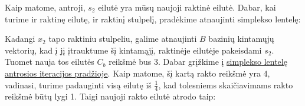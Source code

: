 \documentclass{article}
\begin{document}
Kaip matome, antroji, $s_2$ eilutė yra mūsų naujoji raktinė eilutė. Dabar, kai turime ir raktinę eilutę, ir raktinį stulpelį, pradėkime atnaujinti simplekso lentelę:
\begin{table}[H]
    \centering
\end{table}
Kadangi $x_2$ tapo raktiniu stulpeliu, galime atnaujinti $B$ bazinių kintamųjų vektorių, kad į jį įtrauktume šį kintamąjį, raktinėje eilutėje pakeisdami $s_2$. Tuomet nauja tos eilutės  $C_b$ reikšmė bus 3. Dabar grįžkime į \hyperref[table:2]{simplekso lentelę antrosios iteracijos pradžioje}. Kaip matome, šį kartą rakto reikšmė yra 4, vadinasi, turime padauginti visą eilutę iš $\frac{1}{4}$, kad tolesniems skaičiavimams rakto reikšmė būtų lygi 1. Taigi naujoji rakto eilutė atrodo taip:
\begin{table}[H]
    \centering
\end{table}
\end{document}
